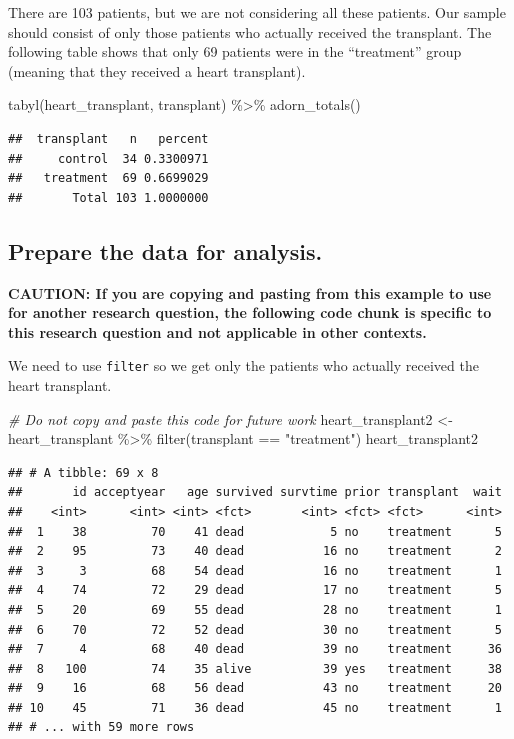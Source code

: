 \documentclass[
]{book}
\newenvironment{Shaded}{\begin{snugshade}}{\end{snugshade}}
\newcommand{\CommentTok}[1]{\textcolor[rgb]{0.56,0.35,0.01}{\textit{#1}}}
\newcommand{\FunctionTok}[1]{\textcolor[rgb]{0.00,0.00,0.00}{#1}}
\newcommand{\NormalTok}[1]{#1}
\newcommand{\OtherTok}[1]{\textcolor[rgb]{0.56,0.35,0.01}{#1}}
\newcommand{\SpecialCharTok}[1]{\textcolor[rgb]{0.00,0.00,0.00}{#1}}
\newcommand{\StringTok}[1]{\textcolor[rgb]{0.31,0.60,0.02}{#1}}
\begin{document}
There are 103 patients, but we are not considering all these patients. Our sample should consist of only those patients who actually received the transplant. The following table shows that only 69 patients were in the ``treatment'' group (meaning that they received a heart transplant).

\begin{Shaded}
\begin{Highlighting}[]
\FunctionTok{tabyl}\NormalTok{(heart\_transplant, transplant) }\SpecialCharTok{\%\textgreater{}\%}
    \FunctionTok{adorn\_totals}\NormalTok{()}
\end{Highlighting}
\end{Shaded}

\begin{verbatim}
##  transplant   n   percent
##     control  34 0.3300971
##   treatment  69 0.6699029
##       Total 103 1.0000000
\end{verbatim}

\hypertarget{one-prop-ex-prepare}{%
\subsection{Prepare the data for analysis.}\label{one-prop-ex-prepare}}

\textbf{CAUTION: If you are copying and pasting from this example to use for another research question, the following code chunk is specific to this research question and not applicable in other contexts.}

We need to use \texttt{filter} so we get only the patients who actually received the heart transplant.

\begin{Shaded}
\begin{Highlighting}[]
\CommentTok{\# Do not copy and paste this code for future work}
\NormalTok{heart\_transplant2 }\OtherTok{\textless{}{-}}\NormalTok{ heart\_transplant }\SpecialCharTok{\%\textgreater{}\%}
    \FunctionTok{filter}\NormalTok{(transplant }\SpecialCharTok{==} \StringTok{"treatment"}\NormalTok{)}
\NormalTok{heart\_transplant2}
\end{Highlighting}
\end{Shaded}

\begin{verbatim}
## # A tibble: 69 x 8
##       id acceptyear   age survived survtime prior transplant  wait
##    <int>      <int> <int> <fct>       <int> <fct> <fct>      <int>
##  1    38         70    41 dead            5 no    treatment      5
##  2    95         73    40 dead           16 no    treatment      2
##  3     3         68    54 dead           16 no    treatment      1
##  4    74         72    29 dead           17 no    treatment      5
##  5    20         69    55 dead           28 no    treatment      1
##  6    70         72    52 dead           30 no    treatment      5
##  7     4         68    40 dead           39 no    treatment     36
##  8   100         74    35 alive          39 yes   treatment     38
##  9    16         68    56 dead           43 no    treatment     20
## 10    45         71    36 dead           45 no    treatment      1
## # ... with 59 more rows
\end{verbatim}
\end{document}
